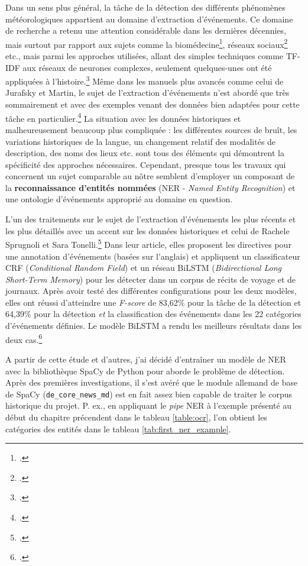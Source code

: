 \documentclass[a4paper,twoside,12pt]{article}
\begin{document}
Dans un sens plus général, la tâche de la détection des différents phénomènes météorologiques appartient au domaine d'extraction d'événements. Ce domaine de recherche a retenu une attention considérable dans les dernières décennies, mais surtout par rapport aux sujets comme la biomédecine\footcite[P. ex.][]{wang_multiple_2017}, réseaux sociaux\footcite{sefh_detection_2020} etc., mais parmi les approches utilisées, allant des simples techniques comme TF-IDF aux réseaux de neurones complexes, seulement quelques-unes ont été appliquées à l'histoire.\footcite{sprugnoli_novel_2019} Même dans les manuels plus avancés comme celui de Jurafsky et Martin, le sujet de l'extraction d'événements n'est abordé que très sommairement et avec des exemples venant des données bien adaptées pour cette tâche en particulier.\footcite[348-350]{jurafsky_speech_2020} La situation avec les données historiques et malheureusement beaucoup plus compliquée : les différentes sources de bruît, les variations historiques de la langue, un changement relatif des modalités de description, des noms des lieux etc. sont tous des éléments qui démontrent la spécificité des approches nécessaires. Cependant, presque tous les travaux qui concernent un sujet comparable au nôtre semblent d'employer un composant de la \textbf{reconnaissance d'entités nommées} (NER - \textit{Named Entity Recognition}) et une ontologie d'événements approprié au domaine en question.

L'un des traitements sur le sujet de l'extraction d'événements les plus récents et les plus détaillés avec un accent sur les données historiques et celui de Rachele Sprugnoli et Sara Tonelli.\footcite{sprugnoli_novel_2019} Dans leur article, elles proposent les directives pour une annotation d'événements (basées sur l'anglais) et appliquent un classificateur CRF (\textit{Conditional Random Field}) et un réseau BiLSTM (\textit{Bidirectional Long Short-Term Memory}) pour les détecter dans un corpus de récits de voyage et de journaux. Après avoir testé des différentes configurations pour les deux modèles, elles ont réussi d'atteindre une \textit{F-score} de 83,62\% pour la tâche de la détection et 64,39\% pour la détection \textit{et} la classification des événements dans les 22 catégories d'événements définies. Le modèle BiLSTM a rendu les meilleurs résultats dans les deux cas.\footcite[][257]{sprugnoli_novel_2019}

A partir de cette étude et d'autres, j'ai décidé d'entraîner un modèle de NER avec la bibliothèque SpaCy de Python pour aborde le problème de détection. Après des premières investigations, il s'est avéré que le module allemand de base de SpaCy (\texttt{de\_core\_news\_md}) est en fait assez bien capable de traiter le corpus historique du projet. P. ex., en appliquant le \textit{pipe} NER à l'exemple présenté au début du chapitre précendent dans le tableau \ref{table:ocr}, l'on obtient les catégories des entités dans le tableau \ref{tab:first_ner_example}.
\end{document}
